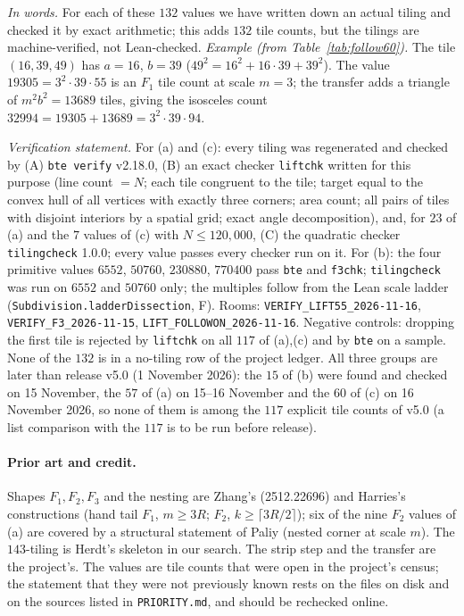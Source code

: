 \documentclass[11pt,reqno]{amsart}
\theoremstyle{plain}
\theoremstyle{definition}
\newcommand{\sF}{\textup{\textsf{F}}}
\newcommand{\rec}[1]{\textup{\texttt{#1}}}
\begin{document}
\noindent \emph{In words.} For each of these $132$ values we have written down an actual tiling and checked it by exact
arithmetic; this adds $132$ tile counts, but the tilings are machine-verified, not Lean-checked.
\emph{Example (from Table~\ref{tab:follow60}).} The tile $(16,39,49)$ has $a=16$, $b=39$ ($49^2=16^2+16\cdot39+39^2$). The
value $19305=3^2\cdot39\cdot55$ is an $F_1$ tile count at scale $m=3$; the transfer adds a triangle of $m^2b^2=13689$ tiles,
giving the isosceles count $32994=19305+13689=3^2\cdot39\cdot94$.

\noindent \emph{Verification statement.} For (a) and (c): every tiling was regenerated and checked by
(A) \texttt{bte verify} v2.18.0, (B) an exact checker \texttt{liftchk} written for this purpose (line count $=N$;
each tile congruent to the tile; target equal to the convex hull of all vertices with exactly three corners; area
count; all pairs of tiles with disjoint interiors by a spatial grid; exact angle decomposition), and, for $23$ of (a)
and the $7$ values of (c) with $N\le120{,}000$, (C) the quadratic checker \texttt{tilingcheck} 1.0.0; every value
passes every checker run on it. For (b): the four primitive values $6552$, $50760$, $230880$, $770400$ pass \texttt{bte} and \texttt{f3chk}; \texttt{tilingcheck}
was run on $6552$ and $50760$ only; the multiples follow from the Lean scale ladder
(\texttt{Subdivision.ladderDissection}, \sF). Rooms: \rec{VERIFY\_LIFT55\_2026-11-16}, \rec{VERIFY\_F3\_2026-11-15},
\rec{LIFT\_FOLLOWON\_2026-11-16}. Negative controls: dropping the first tile is rejected by \texttt{liftchk} on all
$117$ of (a),(c) and by \texttt{bte} on a sample. None of the $132$ is in a no-tiling row of the project ledger. All three groups are later than release v5.0
(1 November 2026): the $15$ of (b) were found and checked on 15 November, the $57$ of (a) on 15--16 November and the $60$ of (c)
on 16 November 2026, so none of them is among the $117$ explicit tile counts of v5.0 (a list comparison with the $117$ is to be run before release).

\paragraph{Prior art and credit.} Shapes $F_1,F_2,F_3$ and the nesting are Zhang's (2512.22696) and Harries's
constructions (hand tail $F_1$, $m\ge3R$; $F_2$, $k\ge\lceil3R/2\rceil$); six of the nine $F_2$ values of (a) are
covered by a structural statement of Paliy (nested corner at scale $m$). The $143$-tiling is Herdt's skeleton in our
search. The strip step and the transfer are the project's. The values are tile counts that were open in the project's
census; the statement that they were not previously known rests on the files on disk and on the sources listed in
\texttt{PRIORITY.md}, and should be rechecked online.
\end{document}
